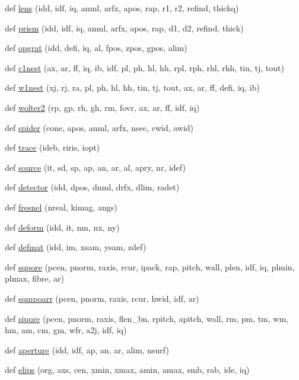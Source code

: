 \begin{DoxyCompactItemize}
\item 
def \hyperlink{namespacexsrt_a0e13f0a134dc17c4e0c4db2f21dedef4}{lens} (idd, idf, iq, anml, arfx, apos, rap, r1, r2, refind, thickq)
\item 
def \hyperlink{namespacexsrt_a890f1fc1330fae1199190ea87f534a0e}{prism} (idd, idf, iq, anml, arfx, apos, rap, d1, d2, refind, thick)
\item 
def \hyperlink{namespacexsrt_a0eef966b5aae4093422ccc402db07ce0}{opgrat} (idd, defi, iq, al, fpos, zpos, gpos, alim)
\item 
def \hyperlink{namespacexsrt_ab404c88c2ec7938d67ae97e3b800401b}{c1nest} (ax, ar, ff, iq, ib, idf, pl, ph, hl, hh, rpl, rph, rhl, rhh, tin, tj, tout)
\item 
def \hyperlink{namespacexsrt_af6099938efe72e809b9bca88b0032624}{w1nest} (xj, rj, ra, pl, ph, hl, hh, tin, tj, tout, ax, ar, ff, defi, iq, ib)
\item 
def \hyperlink{namespacexsrt_ac05cb537bbf56b92fea5fbe3d1809be5}{wolter2} (rp, gp, rh, gh, rm, fovr, ax, ar, ff, idf, iq)
\item 
def \hyperlink{namespacexsrt_a684bb54f6df516f3dce0f3517bd3667b}{spider} (cone, apos, anml, arfx, nsec, cwid, awid)
\item 
def \hyperlink{namespacexsrt_aeb72e4fb8385e5fe604f329b05c32b93}{trace} (ideb, riris, iopt)
\item 
def \hyperlink{namespacexsrt_af8d7e5e8e371b498b9f3ccb322ac257a}{source} (it, sd, sp, ap, an, ar, al, apry, nr, idef)
\item 
def \hyperlink{namespacexsrt_a8c5bd2836e85e10368922546227e6e21}{detector} (idd, dpos, dnml, drfx, dlim, radet)
\item 
def \hyperlink{namespacexsrt_aacf1ff781a47cf97a67df9baf0238661}{fresnel} (nreal, kimag, angs)
\item 
def \hyperlink{namespacexsrt_aa1c9cab5435878d44e9db3e5f0b82e71}{deform} (idd, it, nm, nx, ny)
\item 
def \hyperlink{namespacexsrt_a69d7e8172ff6743e38fc4666ef698e15}{defmat} (idd, im, xsam, ysam, zdef)
\item 
def \hyperlink{namespacexsrt_aef3d3475a31e4d0f7294a7adcfb4ca1d}{sqpore} (pcen, pnorm, raxis, rcur, ipack, rap, pitch, wall, plen, idf, iq, plmin, plmax, fibre, ar)
\item 
def \hyperlink{namespacexsrt_a1b936cb04c912480f996a2338f00f165}{sqmpoarr} (pcen, pnorm, raxis, rcur, hwid, idf, ar)
\item 
def \hyperlink{namespacexsrt_a30f6ce181322f392dd0d8524bc944796}{sipore} (pcen, pnorm, raxis, flen\+\_\+bn, rpitch, apitch, wall, rm, pm, tm, wm, hm, am, cm, gm, wfr, a2j, idf, iq)
\item 
def \hyperlink{namespacexsrt_ab18cc347797a7afd2536b53c56f0036a}{aperture} (idd, idf, ap, an, ar, alim, nsurf)
\item 
def \hyperlink{namespacexsrt_af0348f1498b804fc7bf1cc3f8b7d385d}{elips} (org, axs, cen, xmin, xmax, amin, amax, smb, rab, ide, iq)
\end{DoxyCompactItemize}


